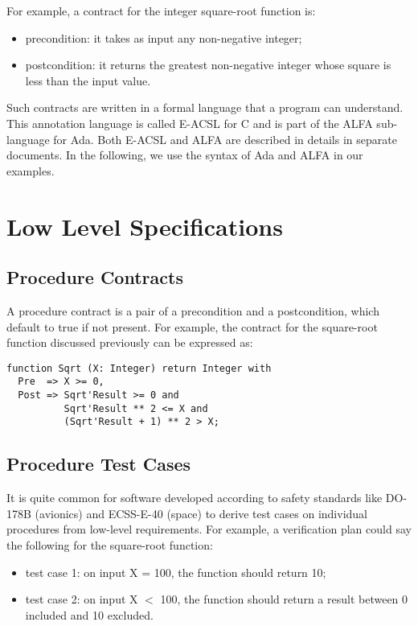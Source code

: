\documentclass{article}
\begin{document}
For example, a contract for the integer square-root function is:
\begin{itemize}
\item precondition: it takes as input any non-negative integer;
\item postcondition: it returns the greatest non-negative integer whose square
  is less than the input value.
\end{itemize}

Such contracts are written in a formal language that a program can
understand. This annotation language is called E-ACSL for C and is part of the
ALFA sub-language for Ada.  Both E-ACSL and ALFA are described in details in
separate documents. In the following, we use the syntax of Ada and ALFA in our
examples.

\section{Low Level Specifications}

\subsection{Procedure Contracts}

A procedure contract is a pair of a precondition and a postcondition, which
default to true if not present. For example, the contract for the square-root
function discussed previously can be expressed as:

\begin{verbatim}
function Sqrt (X: Integer) return Integer with
  Pre  => X >= 0,
  Post => Sqrt'Result >= 0 and 
          Sqrt'Result ** 2 <= X and
          (Sqrt'Result + 1) ** 2 > X;
\end{verbatim}

\subsection{Procedure Test Cases}

It is quite common for software developed according to safety standards like
DO-178B (avionics) and ECSS-E-40 (space) to derive test cases on individual
procedures from low-level requirements. For example, a verification plan could
say the following for the square-root function:
\begin{itemize}
\item test case 1: on input X = 100, the function should return 10;
\item test case 2: on input X $<$ 100, the function should return a result between 0 included and 10 excluded.
\end{itemize}
\end{document}
